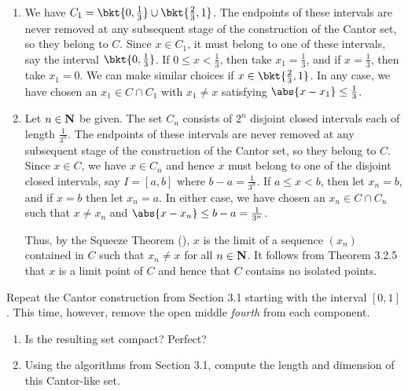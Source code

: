 \documentclass{lew98_solutions}
\begin{document}
\begin{solution}
    \begin{enumerate}
        \item We have \( C_1 = \bkt{ 0, \tfrac{1}{3} } \cup \bkt{ \tfrac{2}{3}, 1 } \). The endpoints of these intervals are never removed at any subsequent stage of the construction of the Cantor set, so they belong to \( C \). Since \( x \in C_1 \), it must belong to one of these intervals, say the interval \( \bkt{ 0, \tfrac{1}{3} } \). If \( 0 \leq x < \tfrac{1}{3} \), then take \( x_1 = \tfrac{1}{3} \), and if \( x = \tfrac{1}{3} \), then take \( x_1 = 0 \). We can make similar choices if \( x \in \bkt{ \tfrac{2}{3}, 1 } \). In any case, we have chosen an \( x_1 \in C \cap C_1 \) with \( x_1 \neq x \) satisfying \( \abs{x - x_1} \leq \tfrac{1}{3} \).

        \item Let \( n \in \mathbf{N} \) be given. The set \( C_n \) consists of \( 2^n \) disjoint closed intervals each of length \( \tfrac{1}{3^n} \). The endpoints of these intervals are never removed at any subsequent stage of the construction of the Cantor set, so they belong to \( C \). Since \( x \in C \), we have \( x \in C_n \) and hence \( x \) must belong to one of the disjoint closed intervals, say \( I = [a, b] \) where \( b - a = \tfrac{1}{3^n} \). If \( a \leq x < b \), then let \( x_n = b \), and if \( x = b \) then let \( x_n = a \). In either case, we have chosen an \( x_n \in C \cap C_n \) such that \( x \neq x_n \) and \( \abs{x - x_n} \leq b - a = \tfrac{1}{3^n} \).

        Thus, by the Squeeze Theorem (), \( x \) is the limit of a sequence \( (x_n) \) contained in \( C \) such that \( x_n \neq x \) for all \( n \in \mathbf{N} \). It follows from Theorem 3.2.5 that \( x \) is a limit point of \( C \) and hence that \( C \) contains no isolated points.
    \end{enumerate}
\end{solution}

\begin{exercise}
\label{ex:3.4.4}
    Repeat the Cantor construction from Section 3.1 starting with the interval \( [0, 1] \). This time, however, remove the open middle \textit{fourth} from each component.
    \begin{enumerate}
        \item Is the resulting set compact? Perfect?

        \item Using the algorithms from Section 3.1, compute the length and dimension of this Cantor-like set.
    \end{enumerate}
\end{exercise}
\end{document}
